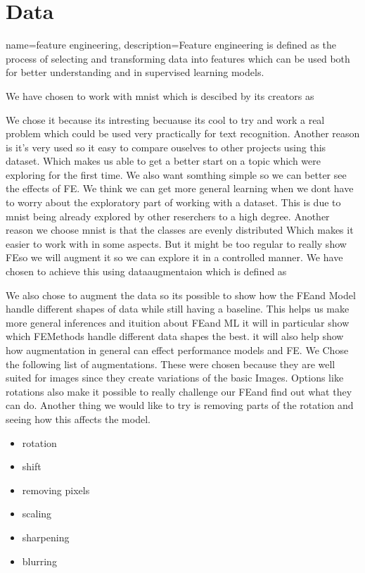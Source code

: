 \section{Data}

{
    name=feature engineering,
    description={Feature engineering is defined as the process of selecting and transforming data into features which can be used both for better understanding and in supervised learning models. }
}

We have chosen to work with mnist which is descibed by its creators as

We chose it because its intresting becuause its cool to try and work a real problem which could be used very practically for text recognition. Another reason is it's very used so it easy to compare ouselves to other projects using this dataset. Which makes us able to get a better start on a topic which were exploring for the first time. We also want somthing simple so we can better see the effects of FE. We think we can get more general learning when we dont have to worry about the exploratory part of working with a dataset. This is due to mnist being already explored by other reserchers to a high degree. Another reason we choose mnist is that the classes are evenly distributed Which makes it easier to work with in some aspects. But it might be too regular to really show \gls{FE}so we will augment it so we can explore it in a controlled manner.
We have chosen to achieve this using dataaugmentaion which is defined as


We also chose to augment the data so its possible to show how the \gls{FE}and Model handle different shapes of data while still having a baseline. This helps us make more general inferences and ituition about \gls{FE}and ML it will in particular show which \gls{FE}Methods handle different data shapes the best. it will also help show how augmentation in general can effect performance models  and FE.
We Chose the following list of augmentations.  These were chosen because they are well suited for images since they create variations of the basic Images. Options like rotations also make it possible to really challenge our \gls{FE}and find out what they can do. Another thing we would like to try is removing parts of the rotation and seeing how this affects the model.

\begin{itemize}
    \item rotation
    \item shift
    \item removing pixels
    \item scaling
    \item sharpening
    \item blurring
  \end{itemize}

 



